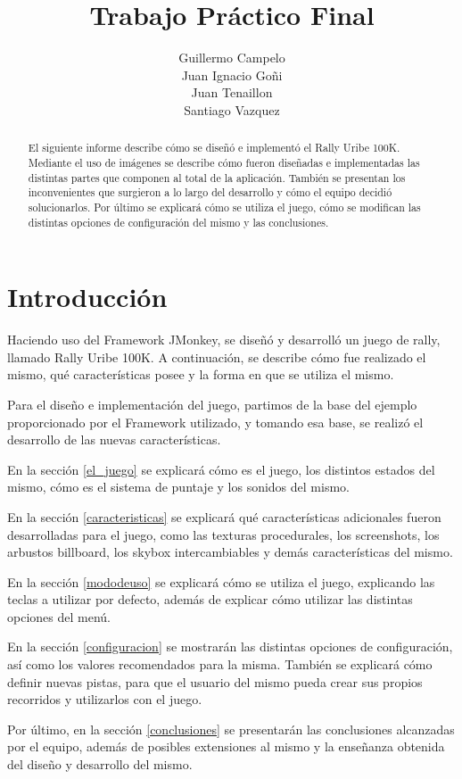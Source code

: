 \documentclass[a4paper,10pt]{article}
\title{Trabajo Práctico Final}
\author{Guillermo Campelo\\Juan Ignacio Goñi\\Juan
Tenaillon\\Santiago Vazquez}
\begin{document}
\maketitle

\begin{abstract}
El siguiente informe describe cómo se diseñó e implementó el Rally Uribe 100K. 
Mediante el uso de imágenes se describe cómo fueron diseñadas e implementadas
las distintas partes que componen al total de la aplicación.  También se
presentan los inconvenientes que surgieron a lo largo del desarrollo y cómo el
equipo decidió solucionarlos.  Por último se explicará cómo se utiliza el juego,
cómo se modifican las distintas opciones de configuración del mismo y las
conclusiones.
\end{abstract}

\section{Introducción}

Haciendo uso del Framework JMonkey, se diseñó y desarrolló un juego de rally,
llamado Rally Uribe 100K.  A continuación, se describe cómo fue realizado el
mismo, qué características posee y la forma en que se utiliza el mismo.

Para el diseño e implementación del juego, partimos de la base del ejemplo
proporcionado por el Framework utilizado, y tomando esa base, se realizó
el desarrollo de las nuevas características.

En la sección \ref{el_juego} se explicará cómo es el juego, los distintos
estados del mismo, cómo es el sistema de puntaje y los sonidos del mismo.

En la sección \ref{caracteristicas} se explicará qué características
adicionales fueron desarrolladas para el juego, como las texturas procedurales,
los screenshots, los arbustos billboard, los skybox intercambiables y demás
características del mismo.

En la sección \ref{mododeuso} se explicará cómo se utiliza el juego, explicando
las teclas a utilizar por defecto, además de explicar cómo utilizar las
distintas opciones del menú.

En la sección \ref{configuracion} se mostrarán las distintas opciones de
configuración, así como los valores recomendados para la misma.  También se
explicará cómo definir nuevas pistas, para que el usuario del mismo pueda crear
sus propios recorridos y utilizarlos con el juego.

Por último, en la sección \ref{conclusiones} se presentarán las conclusiones
alcanzadas por el equipo, además de posibles extensiones al mismo y la
enseñanza obtenida del diseño y desarrollo del mismo.
\end{document}

